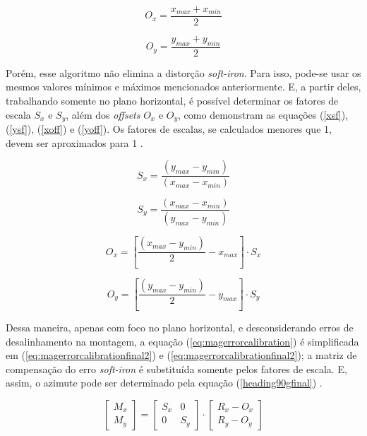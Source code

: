 \begin{equation}
	O_x = \dfrac{x_{max} + x_{min}}{2}
	\label{ox}
\end{equation}

\begin{equation}
	O_y = \dfrac{y_{max} + y_{min}}{2}
	\label{oy}
\end{equation}

Porém, esse algoritmo não elimina a distorção \textit{soft-iron}. Para isso, pode-se usar os mesmos valores mínimos e máximos mencionados anteriormente. E, a partir deles, trabalhando somente no plano horizontal, é possível determinar os fatores de escala $ S_x $ e $ S_y $, além dos \textit{offsets} $ O_x $ e $ O_y $, como demonstram as equações (\ref{xsf}), (\ref{ysf}), (\ref{xoff}) e (\ref{yoff}). Os fatores de escalas, se calculados menores que 1, devem ser aproximados para 1 \cite{carusoSAE}.

\begin{equation}
	S_x = \dfrac{(y_{max} - y_{min})}{(x_{max} - x_{min})}
	\label{xsf}
\end{equation}

\begin{equation}
	S_y = \dfrac{(x_{max} - x_{min})}{(y_{max} - y_{min})}
	\label{ysf}
\end{equation}

\begin{equation}
	O_x = \left[\dfrac{(x_{max} - y_{min})}{2} - x_{max} \right] \cdot S_x
	\label{xoff}
\end{equation}

\begin{equation}
	O_y = \left[\dfrac{(y_{max} - y_{min})}{2} - y_{max} \right] \cdot S_y
	\label{yoff}
\end{equation}

Dessa maneira, apenas com foco no plano horizontal, e desconsiderando erros de desalinhamento na montagem, a equação (\ref{eq:magerrorcalibration}) é simplificada em (\ref{eq:magerrorcalibrationfinal2}) e (\ref{eq:magerrorcalibrationfinal2}); a matriz de compensação do erro \textit{soft-iron} é substituída somente pelos fatores de escala. E, assim, o azimute pode ser determinado pela equação (\ref{heading90gfinal}) .

\begin{equation}
	\left[\begin{array}{c}  M_x\\M_y \end{array}\right] = \left[\begin{array}{cc} S_x&0\\ 0&S_y \end{array}\right] \cdot \left[\begin{array}{c} R_x - O_x\\R_y - O_y\end{array}\right]
	\label{eq:magerrorcalibrationfinal1}
\end{equation}

